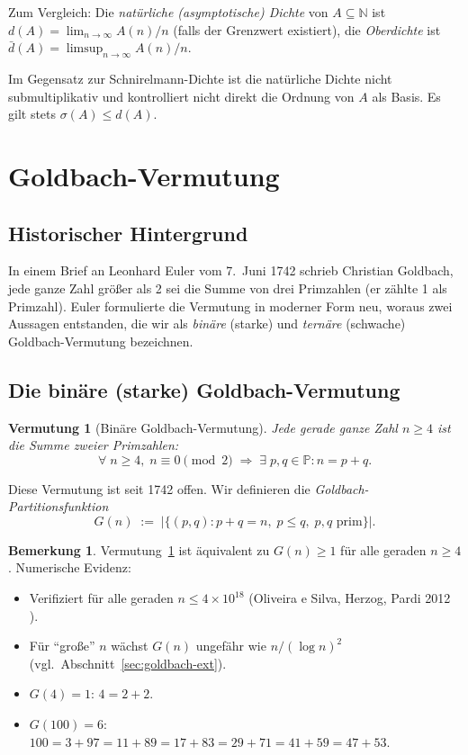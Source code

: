 \documentclass[12pt,a4paper]{amsart}
\newtheorem{vermutung}[theorem]{Vermutung}
\theoremstyle{definition}
\newtheorem{bemerkung}[theorem]{Bemerkung}
\newcommand{\N}{\mathbb{N}}
\newcommand{\Primes}{\mathbb{P}}
\newcommand{\abs}[1]{\left|#1\right|}
\begin{document}
Zum Vergleich: Die \emph{nat\"{u}rliche (asymptotische) Dichte} von
$A \subseteq \N$ ist $d(A) = \lim_{n \to \infty} A(n)/n$ (falls der
Grenzwert existiert), die \emph{Oberdichte} ist
$\bar d(A) = \limsup_{n \to \infty} A(n)/n$.

Im Gegensatz zur Schnirelmann-Dichte ist die nat\"{u}rliche Dichte
nicht submultiplikativ und kontrolliert nicht direkt die Ordnung von $A$
als Basis.  Es gilt stets $\sigma(A) \leq d(A)$.

\section{Goldbach-Vermutung}\label{sec:goldbach}

\subsection{Historischer Hintergrund}

In einem Brief an Leonhard Euler vom 7.\ Juni 1742 schrieb Christian
Goldbach, jede ganze Zahl gr\"{o}\ss{}er als 2 sei die Summe von drei
Primzahlen (er z\"{a}hlte 1 als Primzahl).  Euler formulierte die
Vermutung in moderner Form neu, woraus zwei Aussagen entstanden, die wir
als \emph{bin\"{a}re} (starke) und \emph{tern\"{a}re} (schwache)
Goldbach-Vermutung bezeichnen.

\subsection{Die bin\"{a}re (starke) Goldbach-Vermutung}

\begin{vermutung}[Bin\"{a}re Goldbach-Vermutung]\label{verm:goldbach-binaer}
Jede gerade ganze Zahl $n \geq 4$ ist die Summe zweier Primzahlen:
\[
  \forall\; n \geq 4,\; n \equiv 0 \pmod{2} \;\Longrightarrow\;
  \exists\; p, q \in \Primes : n = p + q.
\]
\end{vermutung}

Diese Vermutung ist seit 1742 offen.  Wir definieren die
\emph{Goldbach-Partitionsfunktion}
\[
  G(n) \;:=\; \abs{\bigl\{(p, q) : p + q = n,\; p \leq q,\;
                p, q \text{ prim}\bigr\}}.
\]

\begin{bemerkung}
Vermutung~\ref{verm:goldbach-binaer} ist \"{a}quivalent zu
$G(n) \geq 1$ f\"{u}r alle geraden $n \geq 4$.
Numerische Evidenz:
\begin{itemize}
\item Verifiziert f\"{u}r alle geraden $n \leq 4 \times 10^{18}$
      (Oliveira e Silva, Herzog, Pardi 2012 \cite{OliveiraSilva2012}).
\item F\"{u}r ``gro\ss{}e'' $n$ w\"{a}chst $G(n)$ ungef\"{a}hr wie
      $n/(\log n)^2$ (vgl.\ Abschnitt~\ref{sec:goldbach-ext}).
\item $G(4) = 1$: $4 = 2 + 2$.
\item $G(100) = 6$: $100 = 3+97 = 11+89 = 17+83 = 29+71 = 41+59 = 47+53$.
\end{itemize}
\end{bemerkung}
\end{document}
